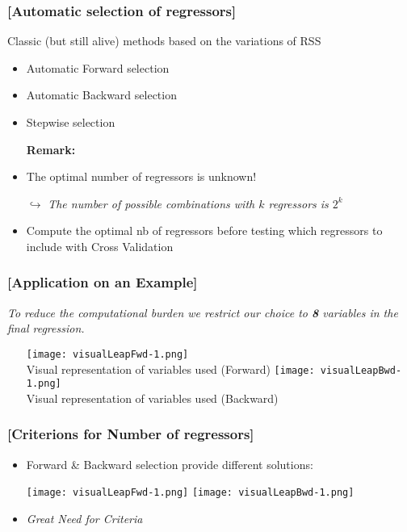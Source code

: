 \documentclass[xcolor=x11names,compress, aspectratio=169]{beamer}
\renewcommand{\(}{\begin{columns}}
\renewcommand{\)}{\end{columns}}
\newcommand{\<}[1]{\begin{column}{#1}}
\renewcommand{\>}{\end{column}}
\begin{document}
\begin{frame} %
\frametitle{\textcolor{brique}{[Automatic selection of regressors]}}
Classic (but still alive) methods based on the variations of RSS
\pause
\begin{itemize}[<+->]
  \item Automatic Forward selection
  \item Automatic Backward selection
  \item Stepwise selection
  \item[\textbf{Remark:}]
  \item The optimal number of regressors is unknown!
  \item[$\hookrightarrow$] \textit{The number of possible combinations with $k$ regressors is $2^k$ }
  \item Compute the optimal nb of regressors before testing which regressors to include with Cross Validation
\end{itemize}
\end{frame}

\begin{frame} %
\frametitle{\textcolor{brique}{[Application on an Example]}}
\emph{To reduce the computational burden we restrict our choice to \textbf{8} variables in the final regression.}
\pause
\begin{itemize}
  \item[]
   { \texttt{[image: visualLeapFwd-1.png]} \\ }
   {Visual representation of variables used (Forward) }
   {\texttt{[image: visualLeapBwd-1.png]} \\ }
   {Visual representation of variables used (Backward) }
\end{itemize}
\end{frame}

\begin{frame} %
\frametitle{\textcolor{brique}{[Criterions for  Number of regressors]}}
\pause
\begin{itemize}[<+->]
  \item Forward \& Backward selection provide different solutions:
  \item[] \texttt{[image: visualLeapFwd-1.png]} \texttt{[image: visualLeapBwd-1.png]}
  \item \begin{center} \emph{\large Great Need for Criteria} \end{center}
\end{itemize}
\end{frame}
\end{document}
